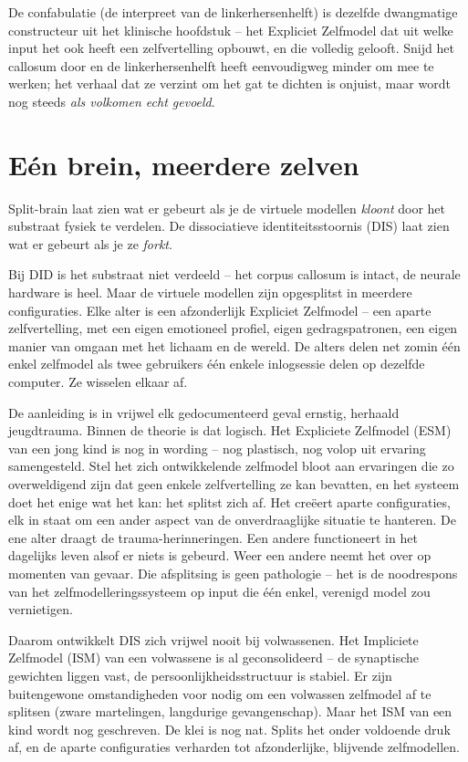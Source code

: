 \documentclass[11pt, twoside, openright]{book}
\begin{document}
De confabulatie (de interpreet van de linkerhersenhelft) is dezelfde dwangmatige constructeur uit het klinische hoofdstuk -- het Expliciet Zelfmodel dat uit welke input het ook heeft een zelfvertelling opbouwt, en die volledig gelooft. Snijd het callosum door en de linkerhersenhelft heeft eenvoudigweg minder om mee te werken; het verhaal dat ze verzint om het gat te dichten is onjuist, maar wordt nog steeds \textit{als volkomen echt gevoeld}.

\section*{Eén brein, meerdere zelven}

Split-brain laat zien wat er gebeurt als je de virtuele modellen \textit{kloont} door het substraat fysiek te verdelen. De dissociatieve identiteitsstoornis (DIS) laat zien wat er gebeurt als je ze \textit{forkt}.

Bij DID is het substraat niet verdeeld -- het corpus callosum is intact, de neurale hardware is heel. Maar de virtuele modellen zijn opgesplitst in meerdere configuraties. Elke alter is een afzonderlijk Expliciet Zelfmodel -- een aparte zelfvertelling, met een eigen emotioneel profiel, eigen gedragspatronen, een eigen manier van omgaan met het lichaam en de wereld. De alters delen net zomin één enkel zelfmodel als twee gebruikers één enkele inlogsessie delen op dezelfde computer. Ze wisselen elkaar af.

De aanleiding is in vrijwel elk gedocumenteerd geval ernstig, herhaald jeugdtrauma. Binnen de theorie is dat logisch. Het Expliciete Zelfmodel (ESM) van een jong kind is nog in wording -- nog plastisch, nog volop uit ervaring samengesteld. Stel het zich ontwikkelende zelfmodel bloot aan ervaringen die zo overweldigend zijn dat geen enkele zelfvertelling ze kan bevatten, en het systeem doet het enige wat het kan: het splitst zich af. Het creëert aparte configuraties, elk in staat om een ander aspect van de onverdraaglijke situatie te hanteren. De ene alter draagt de trauma-herinneringen. Een andere functioneert in het dagelijks leven alsof er niets is gebeurd. Weer een andere neemt het over op momenten van gevaar. Die afsplitsing is geen pathologie -- het is de noodrespons van het zelfmodelleringssysteem op input die één enkel, verenigd model zou vernietigen.

Daarom ontwikkelt DIS zich vrijwel nooit bij volwassenen. Het Impliciete Zelfmodel (ISM) van een volwassene is al geconsolideerd -- de synaptische gewichten liggen vast, de persoonlijkheidsstructuur is stabiel. Er zijn buitengewone omstandigheden voor nodig om een volwassen zelfmodel af te splitsen (zware martelingen, langdurige gevangenschap). Maar het ISM van een kind wordt nog geschreven. De klei is nog nat. Splits het onder voldoende druk af, en de aparte configuraties verharden tot afzonderlijke, blijvende zelfmodellen.
\end{document}
